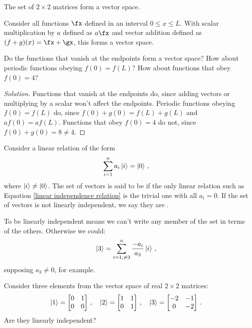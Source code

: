 \begin{example}
The set of $2 \times 2$ matrices form a vector space.
\end{example}

\begin{example}
Consider all functions $\fx$ defined in an interval $0 \leq x \leq L$. With scalar multiplication by $a$ defined as $a\fx$ and vector addition defined as $(f + g)(x) = \fx + \gx$, this forms a vector space.
\end{example}

\begin{exercise}
Do the functions that vanish at the endpoints form a vector space? How about periodic functions obeying $f(0) = f(L)$? How about functions that obey $f(0) = 4$?
\end{exercise}

\begin{proof}[Solution]
Functions that vanish at the endpoints do, since adding vectors or multiplying by a scalar won't affect the endpoints. Periodic functions obeying $f(0) = f(L)$ do, since $f(0) + g(0) = f(L) + g(L)$ and $af(0) = af(L)$. Functions that obey $f(0) = 4$ do not, since $f(0) + g(0) = 8 \neq 4$.
\end{proof}

\begin{shaded*}
Consider a linear relation of the form
\begin{equation}\label{linear independence relation}
    \sum_{i = 1}^n a_i \ket{i} = \ket{0}\,,
\end{equation}
where $\ket{i} \neq \ket{0}$. The set of vectors is said to be  if the only linear relation such as Equation \eqref{linear independence relation} is the trivial one with all $a_i = 0$. If the set of vectors is not linearly independent, we say they are .
\end{shaded*}

To be linearly independent means we can't write any member of the set in terms of the others. Otherwise we could:
\[ \ket{3} = \sum_{i = 1, \neq 3}^n \frac{-a_i}{a_3}\ket{i}\,, \]
supposing $a_3 \neq 0$, for example.

\begin{exercise}
Consider three elements from the vector space of real $2 \times 2$ matrices:
$$
\ket{1} = 
\begin{bmatrix}
0 & 1 \\
0 & 0
\end{bmatrix}\,,
\quad
\ket{2} = 
\begin{bmatrix}
1 & 1 \\
0 & 1
\end{bmatrix}\,,
\quad
\ket{3} = 
\begin{bmatrix}
-2 & -1 \\
0  & -2
\end{bmatrix}\,.
$$
Are they linearly independent?
\end{exercise}

